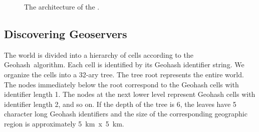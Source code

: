 \documentclass[conference,10pt]{IEEEtran}
\begin{document}
\begin{figure}
  \centering
  \hspace*{\fill}
  \hspace*{\fill}
  \caption{The architecture of the .}\label{fig:system-architecture}
\end{figure}


\subsection{Discovering Geoservers}\label{sec:discovering-geoservers}

The world is divided into a hierarchy of cells according to the Geohash~\cite{geohash}algorithm. Each cell is identified by its Geohash identifier string. We organize the cells into a 32-ary tree. The tree root represents the entire world. The nodes immediately below the root correspond to the Geohash cells with identifier length 1. The nodes at the next lower level represent Geohash cells with identifier length 2, and so on. If the depth of the tree is 6, the leaves have 5 character long Geohash identifiers and the size of the corresponding geographic region is approximately \SI{5}{\kilo\metre}~x~\SI{5}{\kilo\metre}.
\end{document}
